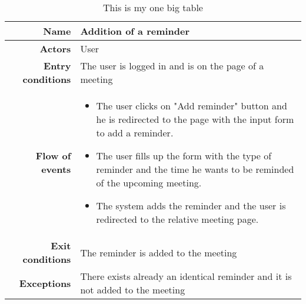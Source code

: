 \begin{table}
\begin{tabular}{r|p{7cm}}
\bf\large Name&\bf\large Addition of a reminder\\
\hline
\hline
\bf Actors&User\\
\hline
\bf Entry conditions&The user is logged in and is on the page of a meeting\\
\hline
\bf Flow of events&
\begin{itemize}
\item The user clicks on "Add reminder" button and he is redirected to the page with the input form to add a reminder.

\item The user fills up the form with the type of reminder and the time he wants to be reminded of the upcoming meeting.

\item  The system adds the reminder and the user is redirected to the relative meeting page.

\end{itemize}
\\
\hline
\bf Exit conditions&The reminder is added to the meeting \\
\hline
\bf Exceptions&There exists already an identical reminder and it is not added to the meeting\\
\hline

\end{tabular}
\caption{This is my one big table} \label{tab:reminderaddition}
\end{table}